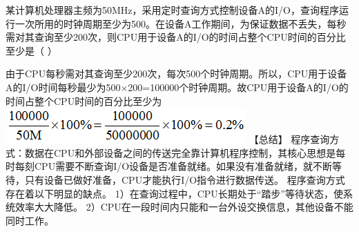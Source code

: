 \question 某计算机处理器主频为50MHz，采用定时查询方式控制设备A的I/O，查询程序运行一次所用的时钟周期至少为500。在设备A工作期间，为保证数据不丢失，每秒需对其查询至少200次，则CPU用于设备A的I/O的时间占整个CPU时间的百分比至少是（
）
\par{}
\begin{solution}由于CPU每秒需对其查询至少200次，每次500个时钟周期。所以，CPU用于设备A的I/O时间每秒最少为500×200=100000个时钟周期。故CPU用于设备A的I/O的时间占整个CPU时间的百分比至少为
\includegraphics[width=3.62500in,height=0.53125in]{computerassets/0b4664d4ddd6eea90c29ef97b411070e.jpeg}
【总结】
程序查询方式：数据在CPU和外部设备之间的传送完全靠计算机程序控制，其核心思想是每时每刻CPU需要不断查询I/O设备是否准备就绪。如果没有准备就绪，就不断等待，只有设备已做好准备，CPU才能执行I/O指令进行数据传送。
程序查询方式存在着以下明显的缺点。
1）在查询过程中，CPU长期处于``踏步''等待状态，使系统效率大大降低。
2）CPU在一段时间内只能和一台外设交换信息，其他设备不能同时工作。
\end{solution}
